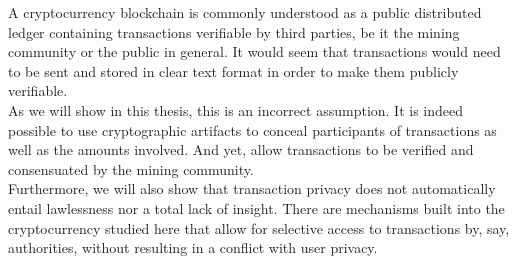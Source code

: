 

A cryptocurrency blockchain is commonly understood as a public distributed ledger containing transactions 
verifiable by third parties, be it the mining community or the public in general.
It would seem that transactions would need to be sent and stored in clear text format in order to
make them publicly verifiable.
\\

As we will show in this thesis, this is an incorrect assumption. It is indeed possible to use cryptographic
artifacts to conceal participants of transactions as well as the amounts involved. And yet, allow transactions
to be verified and consensuated by the mining community.
\\

Furthermore, we will also show that transaction privacy does not automatically entail lawlessness nor
a total lack of insight. There are mechanisms built into the cryptocurrency studied here that allow for selective
access to transactions by, say, authorities, without resulting in a conflict with user privacy.




